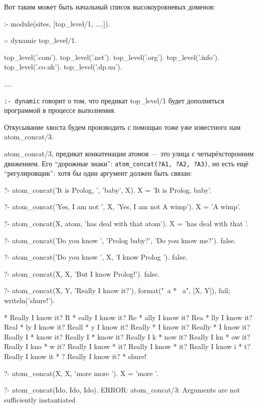 \documentclass[a4paper]{book}
\begin{document}
Вот таким может быть начальный список высокоуровневых доменов:

\begin{example}{}{}
:- module(sites, [top_level/1, ....]).

:- dynamic top_level/1.

top_level('.com').
top_level('.net').
top_level('.org').
top_level('.info').
top_level('.co.uk').
top_level('.dp.ua').

....
\end{example}

\verb|:- dynamic| говорит о том, что предикат top_level/1
будет дополняться программой в процессе выполнения.

Откусывание хвоста будем производить с помощью тоже уже
известного нам atom_concat/3.

atom_concat/3, предикат конкатенации атомов --- это улица с
четырёхсторонним движением. Его ``дорожные знаки'':
\verb|atom_concat(?A1, ?A2, ?A3)|, но есть ещё ``регулировщик'':
хотя бы один аргумент должен быть связан:

\begin{bigexample}{}{}
?- atom_concat('It is Prolog, ', 'baby', X).
X = 'It is Prolog, baby'.

?- atom_concat('Yes, I am not ', X, 'Yes, I am not A wimp').
X = 'A wimp'.

?- atom_concat(X, atom, 'has deal with that atom').
X = 'has deal with that '.

?- atom_concat('Do you know ', 'Prolog baby?', 'Do you know me?').
false.
 
?- atom_concat('Do you know ', X, 'I know Prolog ').
false.

?- atom_concat(X, X, 'But I know Prolog!').
false. %

?- atom_concat(X, Y, 'Really I know it?'), 
   format("~a * ~a\n", [X, Y]),                                             
   fail; writeln('shure!').                                                

 * Really I know it?
R * eally I know it?
Re * ally I know it?
Rea * lly I know it?
Real * ly I know it?
Reall * y I know it?
Really *  I know it?
Really  * I know it?
Really I *  know it?
Really I  * know it?
Really I k * now it?
Really I kn * ow it?
Really I kno * w it?
Really I know *  it?
Really I know  * it?
Really I know i * t?
Really I know it * ?
Really I know it? * 
shure!

?- atom_concat(X, X, 'more more ').
X = 'more '. 

?- atom_concat(Ido, Ido, Ido).
ERROR: atom_concat/3: Arguments are not sufficiently instantiated
\end{bigexample}
\end{document}
